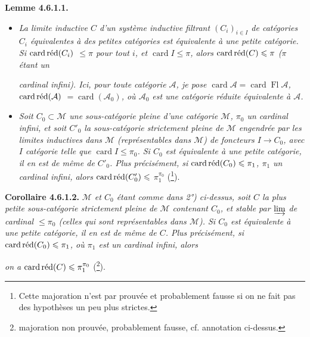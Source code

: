 \documentclass[11pt]{article}
\newcommand{\msp}[1]{\marginpar{\footnotesize [#1]}}
\newcommand{\cardred}{\mathop{\mathrm{card}\,\textup{réd}}\nolimits}
\begin{document}
\textbf{Lemme 4.6.1.1.}
\begin{itemize}[leftmargin=2.5em]
\item[\textit{1°)}] \textit{La limite inductive $C$ d'un système inductive filtrant $(C_i)_{i\in I}$ de catégories $C_i$ équivalentes à des petites catégories est équivalente à une petite catégorie. Si $\cardred(C_i)$ $\leqslant\pi$ pour tout $i$, et $\operatorname{card}I\leqslant\pi$, alors $\cardred(C)\leqslant\pi$ ($\pi$ étant un} %

\msp{page 142}

\textit{cardinal infini). Ici, pour toute catégorie $\mathcal{A}$, je pose $\operatorname{card}\mathcal{A}=\operatorname{card}\operatorname{Fl}\mathcal{A}$, $\cardred(\mathcal{A})$ $=\operatorname{card}(\mathcal{A}_0)$, où $\mathcal{A}_0$ est une catégorie réduite équivalente à $\mathcal{A}$.}
\item[\textit{2°)}] \textit{Soit $C_0\subset\mathcal{M}$ une sous-catégorie pleine d'une catégorie $\mathcal{M}$, $\pi_0$ un cardinal infini, et soit $C'_0$ la sous-catégorie strictement pleine de $\mathcal{M}$ engendrée par les limites inductives dans $\mathcal{M}$ (représentables dans $\mathcal{M}$) de foncteurs $I\longrightarrow C_0$, avec $I$ catégorie telle que $\operatorname{card}I\leqslant\pi_0$. Si $C_0$ est équivalente à une petite catégorie, il en est de même de $C'_0$. Plus précisément, si $\cardred(C_0)\leqslant\pi_1$, $\pi_1$ un cardinal infini, alors $\cardred(C'_0)\leqslant$ $\pi_1^{\pi_0}$} (\footnote[56]{Cette majoration n'est par prouvée et probablement fausse si on ne fait pas des hypothèses un peu plus strictes.}). %
\end{itemize}

\textbf{Corollaire 4.6.1.2.} \textit{$\mathcal{M}$ et $C_0$ étant comme dans 2°) ci-dessus, soit $C$ la plus petite sous-catégorie strictement pleine de $\mathcal{M}$ contenant $C_0$, et stable par $\varinjlim$ de cardinal $\leqslant\pi_0$ (celles qui sont représentables dans $\mathcal{M}$). Si $C_0$ est équivalente à une petite catégorie, il en est de même de $C$. Plus précisément, si $\cardred(C_0)\leqslant\pi_1$, où $\pi_1$ est un cardinal infini, alors}

\msp{page 143}

\textit{on a $\cardred(C)\leqslant\pi_1^{\pi_0}$} (\footnote[57]{majoration non prouvée, probablement fausse, cf. annotation ci-dessus.}).
\end{document}
